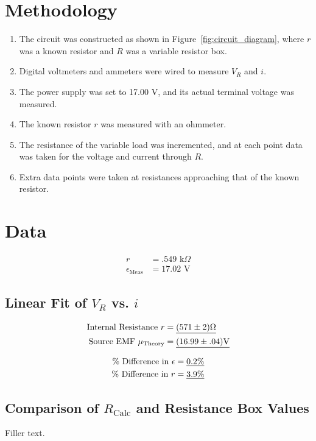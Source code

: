 \documentclass[twocolumn,english]{IEEEtran}
\theoremstyle{plain}
\theoremstyle{plain}
\begin{document}
\section{Methodology}
\begin{enumerate}
 \item The circuit was constructed as shown in Figure~\ref{fig:circuit_diagram}, where $r$ was a known resistor and $R$ was a variable resistor box.
 \item Digital voltmeters and ammeters were wired to measure $V_R$ and $i$.
 \item The power supply was set to 17.00 V, and its actual terminal voltage was measured.
 \item The known resistor $r$ was measured with an ohmmeter.
 \item The resistance of the variable load was incremented, and at each point data was taken for the voltage and current through $R$.
 \item Extra data points were taken at resistances approaching that of the known resistor.
\end{enumerate}

\noindent \hrulefill

\section{Data}
\begin{align*}
 r &= .549 \text{ k}\Omega \\
 \epsilon_{\text{Meas}} &= 17.02 \text{ V}
\end{align*}

  \subsection{\textbf{Linear Fit of $V_R$ vs. $i$}}
  \begin{align*}
   \text{Internal Resistance $r$} 		&=\text{\underline{$(571 \pm 2)\Omega$}}	\\
   \text{Source EMF }\mu_{\text{Theory}}	&=\text{\underline{$(16.99 \pm .04)$V}}
  \end{align*}

  \begin{align*}
   \text{\% Difference in }\epsilon 	&=\text{\underline{0.2\%}}	\\
   \text{\% Difference in }r		&=\text{\underline{3.9\%}}
  \end{align*}

  \subsection{\textbf{Comparison of $R_{\text{Calc}}$ and Resistance Box Values}}
  Filler text.
\end{document}
